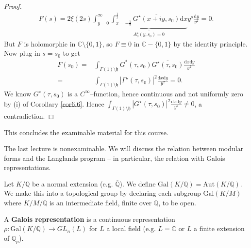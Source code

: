 \documentclass{article}
\theoremstyle{definition}
\begin{document}
\begin{proof}
    \begin{align*}
        F(s) = 2\xi(2s)\int_{y=0}^{\infty} \underbrace{\int_{x=-\frac{1}{2}}^{\frac{1}{2}} \overline{G^\star(x+iy,s_0)}\mathrm{d}x}_{\overline{A_0^\star(y,s_0) = 0}}y^s\frac{\mathrm{d}y}{y^2} = 0.
    \end{align*} 
    But $F$ is holomorphic in $\mathbb{C}\setminus \{0,1\}$, so $F \equiv 0$ in $\mathbb{C} - \{0,1\}$ by the identity principle. Now plug in $s = s_0$ to get
    \begin{align*}
        F(s_0) =& \int_{\Gamma(1)\setminus \mathfrak{h}}^{} G^*(\tau,s_0)\overline{G^\star(\tau,s_0)}\frac{\mathrm{d}x\mathrm{d}y}{y^2} \\
        =& \int_{\Gamma(1)\setminus \mathfrak{h}}^{} |\Gamma^\star(\tau,s_0)|^2\frac{\mathrm{d}x\mathrm{d}y}{y^2} = 0.
    \end{align*}
    We know $G^\star(\tau,s_0)$ is a $C^{\infty}$--function, hence continuous and not uniformly zero by (i) of Corollary \ref{cor6.6}. Hence $\int_{\Gamma(1)\setminus \mathfrak{h}}^{} |G^\star(\tau,s_0)|^2 \frac{\mathrm{d}x\mathrm{d}y}{y^2} \neq 0$, a contradiction.
\end{proof}

This concludes the examinable material for this course.

\vspace{1mm}
 
The last lecture is nonexaminable. We will discuss the relation between modular forms and the Langlands program -- in particular, the relation with Galois representations.
\vspace{1mm}
 
Let $K/\mathbb{Q}$ be a normal extension (e.g. $\overline{\mathbb{Q}}$). We define $\text{Gal}(K/\mathbb{Q}) = \text{Aut}(K/\mathbb{Q})$. We make this into a topological group by declaring each subgroup $\text{Gal}(K/M)$ where $K/M/\mathbb{Q}$ is an intermediate field, finite over $\mathbb{Q}$, to be open.
\vspace{1mm}
 
A \textbf{Galois representation} is a continuous representation $\rho : \text{Gal}(K/\mathbb{Q}) \to GL_n(L)$ for $L$ a local field (e.g. $L=\mathbb{C}$ or $L$ a finite extension of $\mathbb{Q}_p$).
\end{document}
